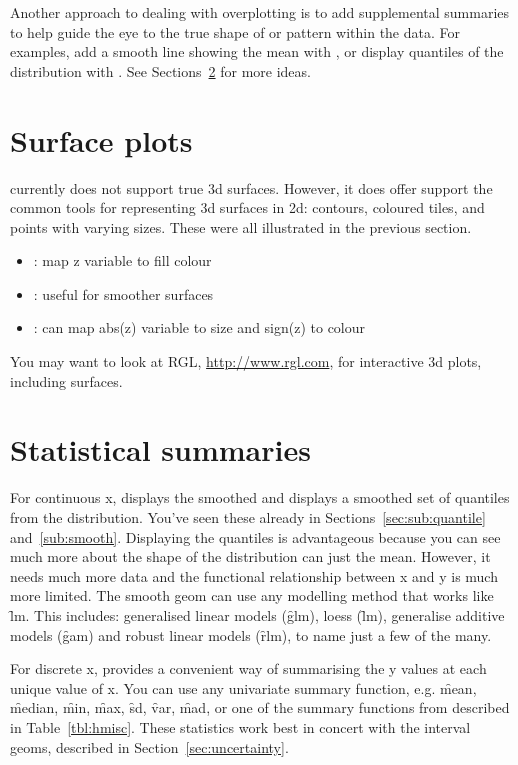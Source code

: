 Another approach to dealing with overplotting is to add supplemental summaries to help guide the eye to the true shape of or pattern within the data.  For examples, add a smooth line showing the mean with , or display quantiles of the distribution with .  See Sections~\ref{sec:summary} for more ideas.

\section{Surface plots}
\label{sec:surface}

\ggplot currently does not support true 3d surfaces.  However, it does offer support the common tools for representing 3d surfaces in 2d: contours, coloured tiles, and points with varying sizes.  These were all illustrated in the previous section.

\begin{itemize}
  \item {}: map z variable to fill colour
  \item {}: useful for smoother surfaces
  \item {}: can map abs(z) variable to size and sign(z) to colour
\end{itemize}

You may want to look at RGL, \url{http://www.rgl.com}, for interactive 3d plots, including surfaces.

\section{Statistical summaries}
\label{sec:summary}

For continuous x,  displays the smoothed and  displays a smoothed set of quantiles from the distribution.  You've seen these already in Sections~\ref{sec:sub:quantile} and~\ref{sub:smooth}.  Displaying the quantiles is advantageous because you can see much more about the shape of the distribution can just the mean.  However, it needs much more data and the functional relationship between x and y is much more limited.  The smooth geom can use any modelling method that works like \f{lm}.  This includes: generalised linear models (\f{glm}), loess (\f{lm}), generalise additive models (\f{gam}) and robust linear models (\f{rlm}), to name just a few of the many.  

For discrete x,  provides a convenient way of summarising the y values at each unique value of x.  You can use any univariate summary function, e.g. \f{mean}, \f{median}, \f{min}, \f{max}, \f{sd}, \f{var}, \f{mad}, or one of the summary functions from  described in Table~\ref{tbl:hmisc}.  These statistics work best in concert with the interval geoms, described in Section~\ref{sec:uncertainty}.


